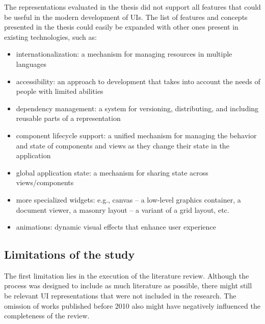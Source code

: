 The representations evaluated in the thesis did not support all features that could be useful in the modern development of UIs.
The list of features and concepts presented in the thesis could easily be expanded with other ones present in existing technologies, such as:
\begin{samepage}
\begin{itemize}
    \item internationalization: a mechanism for managing resources in multiple languages
    \item accessibility: an approach to development that takes into account the needs of people with limited abilities
    \item dependency management: a system for versioning, distributing, and including reusable parts of a representation
    \item component lifecycle support: a unified mechanism for managing the behavior and state of components and views as they change their state in the application
    \item global application state: a mechanism for sharing state across views/components
    \item more specialized widgets: e.g., canvas -- a low-level graphics container, a document viewer, a masonry layout -- a variant of a grid layout, etc.
    \item animations: dynamic visual effects that enhance user experience
\end{itemize}
\end{samepage}

\subsection{Limitations of the study}\label{subsec:limitations-of-the-study}

The first limitation lies in the execution of the literature review.
Although the process was designed to include as much literature as possible, there might still be relevant UI representations that were not included in the research.
The omission of works published before 2010 also might have negatively influenced the completeness of the review.

